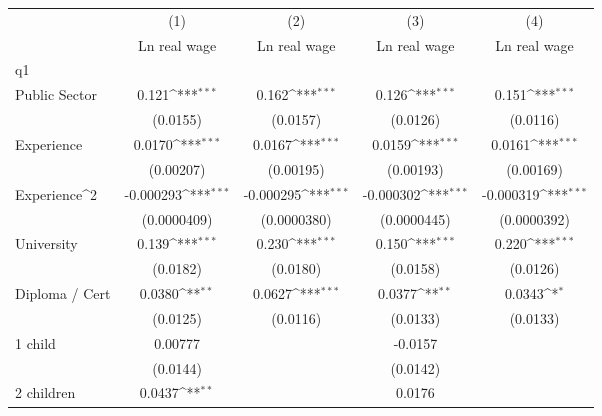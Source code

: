 {
\def\sym#1{\ifmmode^{#1}\else\(^{#1}\)\fi}
\begin{tabular}{l*{4}{c}}
\hline\hline
                    &\multicolumn{1}{c}{(1)}&\multicolumn{1}{c}{(2)}&\multicolumn{1}{c}{(3)}&\multicolumn{1}{c}{(4)}\\
                    &\multicolumn{1}{c}{Ln real wage}&\multicolumn{1}{c}{Ln real wage}&\multicolumn{1}{c}{Ln real wage}&\multicolumn{1}{c}{Ln real wage}\\
\hline
q1                  &                     &                     &                     &                     \\
Public Sector       &       0.121\sym{***}&       0.162\sym{***}&       0.126\sym{***}&       0.151\sym{***}\\
                    &    (0.0155)         &    (0.0157)         &    (0.0126)         &    (0.0116)         \\
[1em]
Experience          &      0.0170\sym{***}&      0.0167\sym{***}&      0.0159\sym{***}&      0.0161\sym{***}\\
                    &   (0.00207)         &   (0.00195)         &   (0.00193)         &   (0.00169)         \\
[1em]
Experience^{2}      &   -0.000293\sym{***}&   -0.000295\sym{***}&   -0.000302\sym{***}&   -0.000319\sym{***}\\
                    & (0.0000409)         & (0.0000380)         & (0.0000445)         & (0.0000392)         \\
[1em]
University          &       0.139\sym{***}&       0.230\sym{***}&       0.150\sym{***}&       0.220\sym{***}\\
                    &    (0.0182)         &    (0.0180)         &    (0.0158)         &    (0.0126)         \\
[1em]
Diploma / Cert      &      0.0380\sym{**} &      0.0627\sym{***}&      0.0377\sym{**} &      0.0343\sym{*}  \\
                    &    (0.0125)         &    (0.0116)         &    (0.0133)         &    (0.0133)         \\
[1em]
1 child             &     0.00777         &                     &     -0.0157         &                     \\
                    &    (0.0144)         &                     &    (0.0142)         &                     \\
[1em]
2 children          &      0.0437\sym{**} &                     &      0.0176         &                     \\

\end{tabular}}

